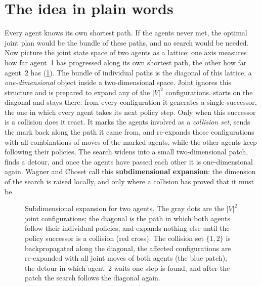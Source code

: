 \section{The idea in plain words}
\label{sec:ch11-intuition}

Every agent knows its own shortest path. If the agents never met, the
optimal joint plan would be the bundle of these paths, and no search would
be needed. Now picture the joint state space of two agents as a lattice:
one axis measures how far agent~1 has progressed along its own shortest
path, the other how far agent~2 has (\cref{fig:ch11-idea}). The bundle of
individual paths is the diagonal of this lattice, a \emph{one-dimensional}
object inside a two-dimensional space. Joint \astar ignores this structure
and is prepared to expand any of the $|V|^2$ configurations. \mstar starts
on the diagonal and stays there: from every configuration it generates a
single successor, the one in which every agent takes its next policy step.
Only when this successor is a collision does it react. It marks the agents
involved as a \emph{collision set}, sends the mark back along the path it
came from, and re-expands those configurations with all combinations of
moves of the marked agents, while the other agents keep following their
policies. The search widens into a small two-dimensional patch, finds a
detour, and once the agents have passed each other it is one-dimensional
again. Wagner and Choset call this \textbf{subdimensional
expansion}: the dimension of the search is
raised locally, and only where a collision has proved that it must be.

\begin{figure}[!tb]
  \centering
  \caption{Subdimensional expansion for two agents. The gray dots are the
  $|V|^2$ joint configurations; the diagonal is the path in which both
  agents follow their individual policies, and \mstar expands nothing else
  until the policy successor is a collision (red cross). The collision set
  $\{1,2\}$ is backpropagated along the diagonal, the affected
  configurations are re-expanded with all joint moves of both agents (the
  blue patch), the detour in which agent~2 waits one step is found, and
  after the patch the search follows the diagonal again.}
  \label{fig:ch11-idea}
\end{figure}

